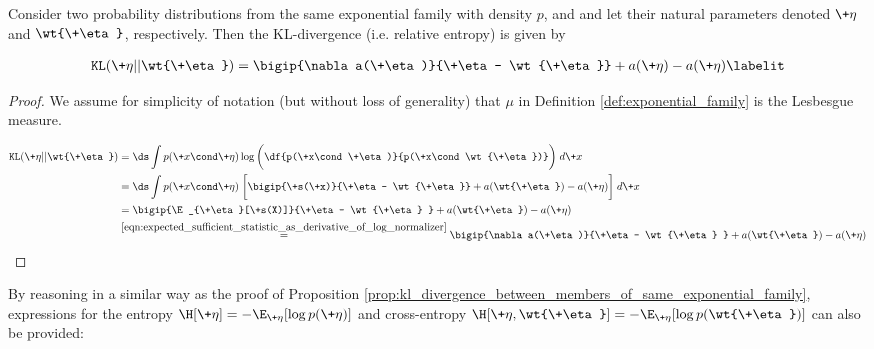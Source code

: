 \documentclass{article} %
\newcommand{\obs}{\+x}
\newcommand{\logNormalizerFunction}{a}
\newcommand{\sufficientStatsFunction}{\+s}
\newcommand{\naturalParam}{\+\eta}
\begin{document}
\begin{proposition}
Consider two probability distributions from the same exponential family with density $p$, and and let their natural  parameters denoted $\naturalParam$ and $\wt{\naturalParam}$, respectively.  Then the KL-divergence (i.e. relative entropy) is given by

\begin{align*}
\texttt{KL}(\naturalParam || \wt{\naturalParam}) = \bigip{\nabla \logNormalizerFunction(\naturalParam)}{\naturalParam - \wt{\naturalParam}} + \logNormalizerFunction(\naturalParam) - \logNormalizerFunction(\naturalParam) 
\labelit \label{eqn:KL_divergence_between_two_members_of_the_sample_exponential_family}
\end{align*}
 


\begin{proof}
We assume for simplicity of notation (but without loss of generality) that $\mu$ in Definition \ref{def:exponential_family} is the Lesbesgue measure. 

\begin{align*}
\texttt{KL}(\naturalParam || \wt{\naturalParam}) &= \ds\int p(\obs \cond \naturalParam) \log \bigg( \df{p(\obs \cond \naturalParam)}{p(\obs \cond \wt{\naturalParam})}\bigg) \;d\obs \\ 
& = \ds\int p(\obs \cond \naturalParam) \; \bigg[ \bigip{\sufficientStatsFunction(\obs)}{\naturalParam - \wt{\naturalParam}}  + \logNormalizerFunction(\wt{\naturalParam}) - \logNormalizerFunction(\naturalParam) \bigg] \; d\obs \\
&= \bigip{\E_{\naturalParam}[\sufficientStatsFunction(X)]}{\naturalParam - \wt{\naturalParam} } + \logNormalizerFunction(\wt{\naturalParam}) - \logNormalizerFunction(\naturalParam) \\
& \stackrel{\eqref{eqn:expected_sufficient_statistic_as_derivative_of_log_normalizer}}{=}  \bigip{\nabla \logNormalizerFunction(\naturalParam)}{\naturalParam - \wt{\naturalParam} } + \logNormalizerFunction(\wt{\naturalParam}) - \logNormalizerFunction(\naturalParam)
\end{align*}
	
\end{proof}
\label{prop:kl_divergence_between_members_of_same_exponential_family}
\end{proposition}

By reasoning in a similar way as the proof of Proposition \ref{prop:kl_divergence_between_members_of_same_exponential_family}, expressions for the entropy $\H[\naturalParam] = -\E_{\naturalParam}[\log p(\naturalParam)]$ and cross-entropy $\H[\naturalParam, \wt{\naturalParam}] = -\E_{\naturalParam}[\log p(\wt{\naturalParam})]$ can also be provided:
\end{document}
